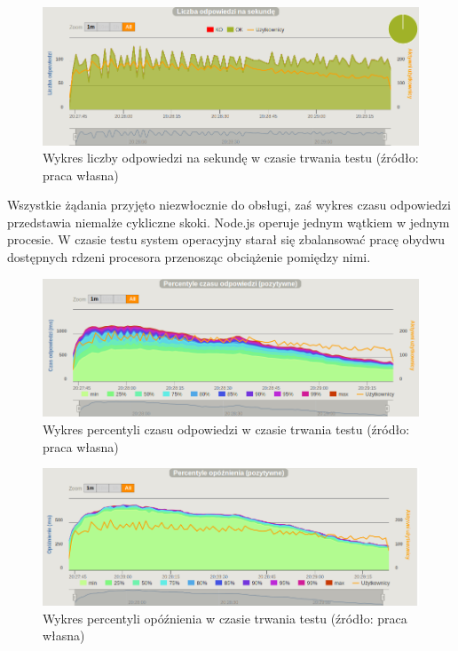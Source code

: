 \documentclass[12pt,twoside]{article}
\begin{document}
\begin{figure}[htbp]
\centering
\includegraphics[resolution=150]{test_results/js/matrix/screenshots/responses.png}
\caption{Wykres liczby odpowiedzi na sekundę w czasie trwania testu (źródło: praca własna)}
\end{figure}

Wszystkie żądania przyjęto niezwłocznie do obsługi, zaś wykres czasu
odpowiedzi przedstawia niemalże cykliczne skoki. Node.js operuje jednym
wątkiem w jednym procesie. W czasie testu system operacyjny starał się
zbalansować pracę obydwu dostępnych rdzeni procesora przenosząc
obciążenie pomiędzy nimi.

\begin{figure}[htbp]
\centering
\includegraphics[resolution=150]{test_results/js/matrix/screenshots/response_percentile.png}
\caption{Wykres percentyli czasu odpowiedzi w czasie trwania testu (źródło: praca własna)}
\label{js:matrix:response_percentile}
\end{figure}

\begin{figure}[htbp]
\centering
\includegraphics[resolution=150]{test_results/js/matrix/screenshots/latency_percentile.png}
\caption{Wykres percentyli opóźnienia w czasie trwania testu (źródło: praca własna)}
\label{js:matrix:latency_percentile}
\end{figure}
\end{document}

